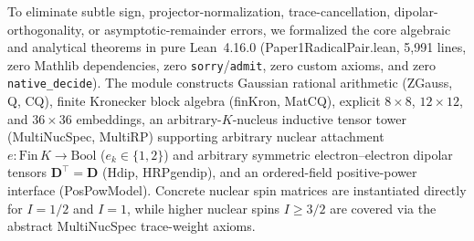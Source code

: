 \documentclass[twocolumn,10pt,amsmath,amssymb,floatfix]{revtex4-2}
\theoremstyle{plain}
\theoremstyle{definition}
\newcommand{\leanid}[1]{{\footnotesize\ttfamily\def\_{\textunderscore\allowbreak}#1}}
\begin{document}
To eliminate subtle sign, projector-normalization, trace-cancellation, dipolar-orthogonality, or asymptotic-remainder errors, we formalized the core algebraic and analytical theorems in pure Lean~4.16.0 (\leanid{Paper1\_RadicalPair.lean}, 5,991 lines, zero Mathlib dependencies, zero \texttt{sorry}/\texttt{admit}, zero custom axioms, and zero \texttt{native\_decide}). The module constructs Gaussian rational arithmetic (\leanid{ZGauss}, \leanid{Q}, \leanid{CQ}), finite Kronecker block algebra (\leanid{finKron}, \leanid{MatCQ}), explicit $8\times 8$, $12\times 12$, and $36\times 36$ embeddings, an arbitrary-$K$-nucleus inductive tensor tower (\leanid{MultiNucSpec}, \leanid{MultiRP}) supporting arbitrary nuclear attachment $e\colon\mathrm{Fin}\,K\to\mathrm{Bool}$ ($e_k \in \{1,2\}$) and arbitrary symmetric electron--electron dipolar tensors $\mathbf{D}^\top = \mathbf{D}$ (\leanid{H\_dip}, \leanid{H\_RP\_gen\_dip}), and an ordered-field positive-power interface (\leanid{PosPowModel}). Concrete nuclear spin matrices are instantiated directly for $I=1/2$ and $I=1$, while higher nuclear spins $I \ge 3/2$ are covered via the abstract \leanid{MultiNucSpec} trace-weight axioms.
\end{document}
